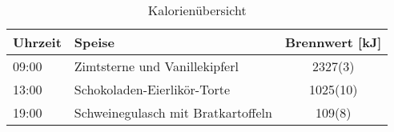 \documentclass{scrartcl}
\begin{document}
\newcommand{\zeit}[2]{ #1:#2}

\begin{table}
\centering
\caption{Kalorienübersicht}
\label{tab:kalorien}
\begin{tabular}{l l S[separate-uncertainty]}
\toprule
\textbf{Uhrzeit} & \textbf{Speise} & \textbf{Brennwert [\si{\kilo\joule}]} \\ 
\midrule
\zeit{09}{00} & Zimtsterne und Vanillekipferl & 2327(3)\\
\zeit{13}{00} & Schokoladen-Eierlikör-Torte  & 1025(10)\\
\zeit{19}{00} & Schweinegulasch mit Bratkartoffeln & 109(8) \\
\bottomrule
\end{tabular}
\end{table}
\end{document}

